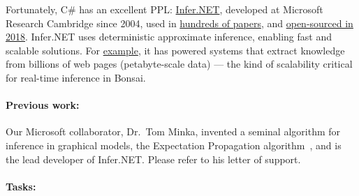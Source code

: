 Fortunately, C\# has an excellent PPL:
\href{https://dotnet.github.io/infer/}{Infer.NET}, developed at Microsoft
Research Cambridge since 2004, used in
\href{https://dotnet.github.io/infer/papers.html}{hundreds of papers}, and
\href{https://www.microsoft.com/en-us/research/blog/the-microsoft-infer-net-machine-learning-framework-goes-open-source/}{open-sourced
in 2018}.  Infer.NET uses deterministic approximate inference, enabling fast
and scalable solutions. For
\href{https://www.microsoft.com/en-us/research/blog/the-microsoft-infer-net-machine-learning-framework-goes-open-source/}{example},
it has powered systems that extract knowledge from billions of web pages
(petabyte-scale data) — the kind of scalability critical for real-time
inference in Bonsai.

\paragraph{Previous work:} Our Microsoft collaborator, Dr.~Tom Minka, invented
a seminal algorithm for inference in graphical models, the Expectation
Propagation algorithm~\citep{minka01}, and is the lead developer of Infer.NET.
Please refer to his letter of support.

\paragraph{Tasks:}\mbox{}\\

